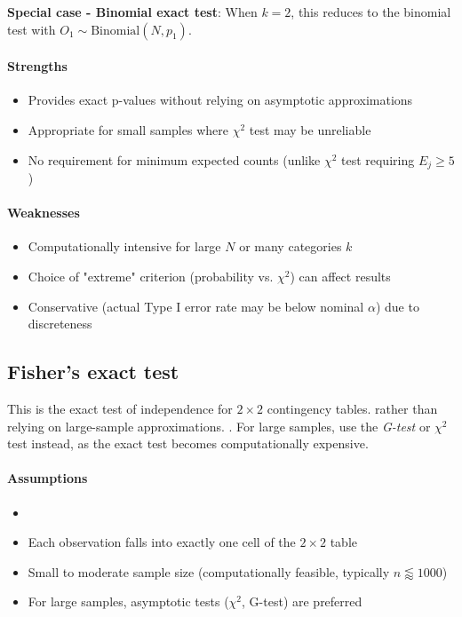 \textbf{Special case - Binomial exact test}: When $k=2$, this reduces to the binomial test
with $O_1 \sim \text{Binomial}(N, p_1)$.

\paragraph{Strengths}
\begin{itemize}
    \item Provides exact p-values without relying on asymptotic approximations
    \item Appropriate for small samples where $\chi^2$ test may be unreliable
    \item No requirement for minimum expected counts (unlike $\chi^2$ test requiring $E_j \geq 5$)
\end{itemize}

\paragraph{Weaknesses}
\begin{itemize}
    \item Computationally intensive for large $N$ or many categories $k$
    \item Choice of "extreme" criterion (probability vs. $\chi^2$) can affect results
    \item Conservative (actual Type I error rate may be below nominal $\alpha$) due to discreteness
\end{itemize}




\subsection{Fisher's exact test}
This is the exact test of independence for $2\times 2$ contingency tables. 
rather than relying on large-sample approximations. . For large samples, use the \emph{G-test} or
$\chi^2$ test instead, as the exact test becomes computationally expensive.

\paragraph{Assumptions}
\begin{itemize}
    \item {}
    \item Each observation falls into exactly one cell of the $2\times 2$ table
    \item Small to moderate sample size (computationally feasible, typically $n \lessapprox 1000$)
    \item For large samples, asymptotic tests ($\chi^2$, G-test) are preferred
\end{itemize}

